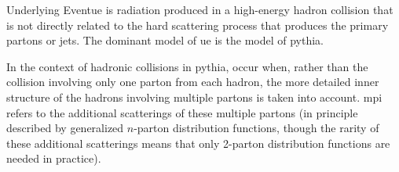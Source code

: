 \begin{subappendices}
\begin{definitionbox}{Underlying Event}{ue}
     is radiation produced in a high-energy hadron collision that is not directly related to the hard scattering process that produces the primary partons or jets.
    The dominant model of \gls{ue} is the  model of \gls{pythia}.

    In the context of hadronic collisions in \gls{pythia},  occur when, rather than the collision involving only one parton from each hadron, the more detailed inner structure of the hadrons involving multiple partons is taken into account.
    \gls{mpi} refers to the additional scatterings of these multiple partons (in principle described by generalized \(n\)-parton distribution functions, though the rarity of these additional scatterings means that only 2-parton distribution functions are needed in practice).
\end{definitionbox}






\end{subappendices}
